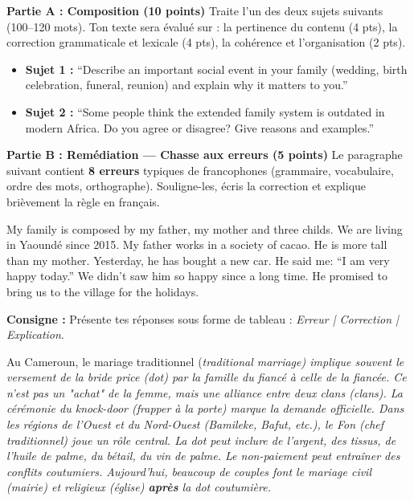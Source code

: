 \documentclass[11pt]{article}
\newcommand{\cle}[1]{{\popxbold\color{popdark}#1}}
\newcommand{\eng}[1]{\ifmmode\text{\textit{#1}}\else\begingroup\selectlanguage{english}\itshape #1\endgroup\fi}
\begin{document}
\begin{exercice}
\textbf{Partie A : Composition (10 points)}
Traite l'un des deux sujets suivants (100--120 mots). Ton texte sera évalué sur : la pertinence du contenu (4 pts), la correction grammaticale et lexicale (4 pts), la cohérence et l'organisation (2 pts).
\begin{itemize}
    \item \textbf{Sujet 1 :} “Describe an important social event in your family (wedding, birth celebration, funeral, reunion) and explain why it matters to you.”
    \item \textbf{Sujet 2 :} “Some people think the extended family system is outdated in modern Africa. Do you agree or disagree? Give reasons and examples.”
\end{itemize}

\textbf{Partie B : Remédiation — Chasse aux erreurs (5 points)}
Le paragraphe suivant contient \textbf{8 erreurs} typiques de francophones (grammaire, vocabulaire, ordre des mots, orthographe). Souligne-les, écris la correction et explique brièvement la règle en français.
\begin{textebox}
My family is composed by my father, my mother and three childs. We are living in Yaoundé since 2015. My father works in a society of cacao. He is more tall than my mother. Yesterday, he has bought a new car. He said me: “I am very happy today.” We didn't saw him so happy since a long time. He promised to bring us to the village for the holidays.
\end{textebox}
\textbf{Consigne :} Présente tes réponses sous forme de tableau : \textit{Erreur | Correction | Explication}.
\end{exercice}

\begin{savaistu}
Au Cameroun, le mariage traditionnel (\eng{traditional marriage}) implique souvent le versement de la \cle{bride price} (dot) par la famille du fiancé à celle de la fiancée. Ce n'est pas un "achat" de la femme, mais une alliance entre deux clans (\eng{clans}). La cérémonie du \cle{knock-door} (frapper à la porte) marque la demande officielle. Dans les régions de l'Ouest et du Nord-Ouest (Bamileke, Bafut, etc.), le \cle{Fon} (chef traditionnel) joue un rôle central. La dot peut inclure de l'argent, des tissus, de l'huile de palme, du bétail, du vin de palme. Le non-paiement peut entraîner des conflits coutumiers. Aujourd'hui, beaucoup de couples font le mariage civil (mairie) et religieux (église) \textbf{après} la dot coutumière.
\end{savaistu}
\end{document}
